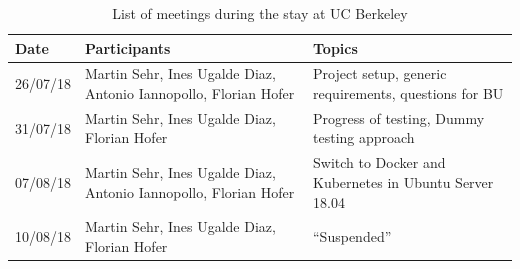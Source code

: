 \documentclass[]{scrartcl}
\begin{document}
\begin{table}[h]
	\centering
	\caption{List of meetings during the stay at UC Berkeley}
	
	\begin{tabular}{l p{5cm} p{5cm}}
	Date & Participants & Topics \\
	\hline
	26/07/18 & Martin Sehr, Ines Ugalde Diaz, Antonio Iannopollo, Florian Hofer & Project setup, generic requirements, questions for BU\\
	31/07/18 & Martin Sehr, Ines Ugalde Diaz, Florian Hofer & Progress of testing, Dummy testing approach\\
	07/08/18 & Martin Sehr, Ines Ugalde Diaz, Antonio Iannopollo, Florian Hofer & Switch to Docker and Kubernetes in Ubuntu Server 18.04\\
	10/08/18 & Martin Sehr, Ines Ugalde Diaz, Florian Hofer & ``Suspended''\\
	\hline
	\end{tabular}
	
	\label{tab:meeting}
\end{table}



\end{document}
